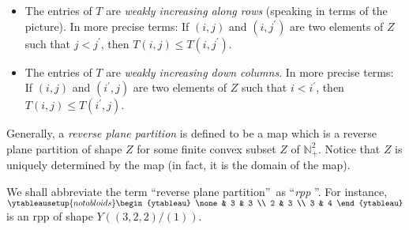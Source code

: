 \documentclass[numbers=enddot,12pt,final,onecolumn,notitlepage]{scrartcl}%
\theoremstyle{definition}
\begin{document}
\begin{itemize}
\item The entries of $T$ are \textit{weakly increasing along rows} (speaking
in terms of the picture). In more precise terms: If $\left(  i,j\right)  $ and
$\left(  i,j^{\prime}\right)  $ are two elements of $Z$ such that
$j<j^{\prime}$, then $T\left(  i,j\right)  \leq T\left(  i,j^{\prime}\right)
$.

\item The entries of $T$ are \textit{weakly increasing down columns}. In more
precise terms: If $\left(  i,j\right)  $ and $\left(  i^{\prime},j\right)  $
are two elements of $Z$ such that $i<i^{\prime}$, then $T\left(  i,j\right)
\leq T\left(  i^{\prime},j\right)  $.
\end{itemize}

Generally, a \textit{reverse plane partition} is defined to be a map which is
a reverse plane partition of shape $Z$ for some finite convex subset $Z$ of
$\mathbb{N}_{+}^{2}$. Notice that $Z$ is uniquely determined by the map (in
fact, it is the domain of the map).

We shall abbreviate the term \textquotedblleft reverse plane
partition\textquotedblright\ as \textquotedblleft\textit{rpp}%
\textquotedblright. For instance, $%
\ytableausetup{notabloids}
\begin{ytableau}
\none& 3 & 3 \\
2 & 3 \\
3 & 4
\end{ytableau}%
$ is an rpp of shape $Y\left(  \left(  3,2,2\right)  /\left(  1\right)
\right)  $.
\end{document}
